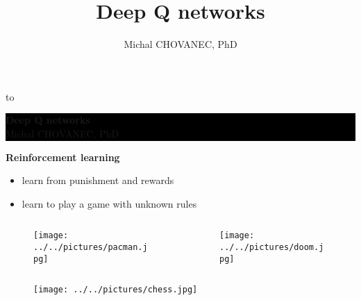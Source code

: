 \documentclass[xcolor=dvipsnames]{beamer}
\title{\color{white} \bf Deep Q networks}
\author{\color{white} Michal CHOVANEC, PhD}
\date[EURP]{}
\begin{document}
{
    \usebackgroundtemplate
    {
        \vbox to 
    }
    \begin{frame}



    \centering
     \colorbox{black}
     {
        \begin{minipage}{7cm}
           {\LARGE \color{white} \bf Deep Q networks} \\
           {\LARGE \color{white} Michal CHOVANEC, PhD} \\
       \end{minipage}
     }


    \end{frame}
}



\begin{frame}{\bf Reinforcement learning}

\begin{itemize}
  \item learn from punishment and rewards
  \item learn to play a game with unknown rules
\end{itemize}

\begin{columns}
\begin{column}{0.5\textwidth}

  \begin{figure}
    \texttt{[image: ../../pictures/pacman.jpg]}
  \end{figure}

\end{column}
\begin{column}{0.5\textwidth}  %

  \begin{figure}
  \texttt{[image: ../../pictures/doom.jpg]}
  \end{figure}

\end{column}
\end{columns}

\vspace{-40pt}
\begin{figure}
\texttt{[image: ../../pictures/chess.jpg]}
\end{figure}

\end{frame}
\end{document}
